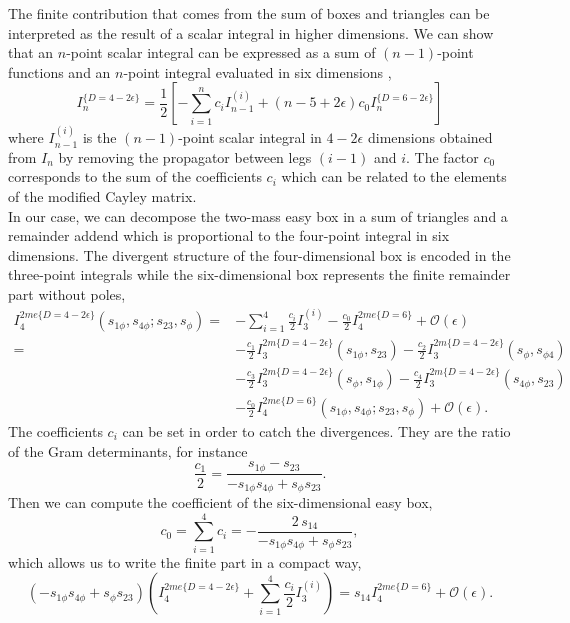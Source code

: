The finite contribution that comes from the sum of boxes and triangles can be interpreted as the result of a scalar integral in higher dimensions. We can show that an $n$-point scalar integral can be expressed as a sum of $(n-1)$-point functions and an $n$-point integral evaluated in six dimensions \cite{Bern_1993},
$$
	I_n^{\{D=4-2\epsilon\}}=\frac{1}{2}\left[-\sum_{i=1}^n c_i I_{n-1}^{(i)}+(n-5+2\epsilon)c_0I_n^{\{D=6-2\epsilon\}}\right]
$$
where $I_{n-1}^{(i)}$ is the $(n-1)$-point scalar integral in $4-2\epsilon$ dimensions obtained from $I_n$ by removing the propagator between legs $(i-1)$ and $i$. The factor $c_0$ corresponds to the sum of the coefficients $c_i$ which can be related to the elements of the modified Cayley matrix. \\
In our case, we can decompose the two-mass easy box in a sum of triangles and a remainder addend which is proportional to the four-point integral in six dimensions. The divergent structure of the four-dimensional box is encoded in the three-point integrals while the six-dimensional box represents the finite remainder part without poles,
\begin{align*}
	I_4^{2me\{D=4-2\epsilon\}}(s_{1\phi},s_{4\phi};s_{23},s_{\phi})=&-\sum_{i=1}^{4} \frac{c_i}{2}I_{3}^{(i)}-\frac{c_0}{2}I_4^{2me\{D=6\}}+\mathcal{O}(\epsilon)\\
	=&-\frac{c_1}{2}I_3^{2m\{D=4-2\epsilon\}}(s_{1\phi},s_{23})-\frac{c_2}{2}I_3^{2m\{D=4-2\epsilon\}}(s_{\phi},s_{\phi4})\\
	&-\frac{c_3}{2} I_3^{2m\{D=4-2\epsilon\}}(s_{\phi},s_{1\phi})-\frac{c_4}{2} I_3^{2m\{D=4-2\epsilon\}}(s_{4\phi},s_{23})\\
	&-\frac{c_0}{2} I_4^{2me\{D=6\}}(s_{1\phi},s_{4\phi};s_{23},s_\phi)+\mathcal{O}(\epsilon).
\end{align*}
The coefficients $c_i$ can be set in order to catch the divergences. They are the ratio of the Gram determinants, for instance
$$
	\frac{c_1}{2}=\frac{s_{1\phi}-s_{23}}{-s_{1\phi}s_{4\phi}+s_\phi s_{23}}.
$$
Then we can compute the coefficient of the six-dimensional easy box,
$$c_0=\sum_{i=1}^4 c_i=-\frac{2\,s_{14}}{-s_{1\phi}s_{4\phi}+s_\phi s_{23}},$$
which allows us to write the finite part in a compact way,
$$
	(-s_{1\phi}s_{4\phi}+s_\phi s_{23})\left(I_4^{2me\{D=4-2\epsilon\}}+\sum_{i=1}^4\frac{c_i}{2}I_3^{(i)}\right)=s_{14}I_4^{2me\{D=6\}}+\mathcal{O}(\epsilon).
$$
